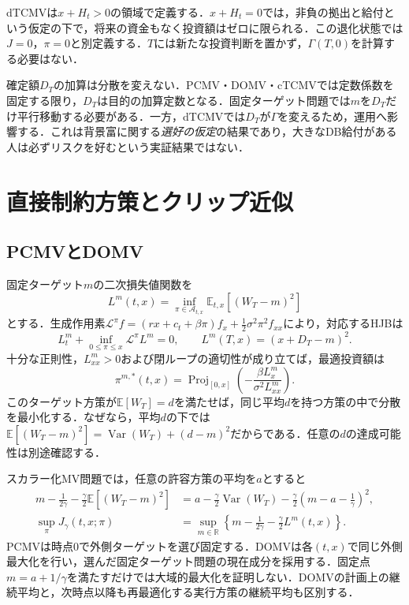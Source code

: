 \documentclass[10pt,a4paper]{article}
\numberwithin{equation}{section}
\numberwithin{table}{section}
\numberwithin{figure}{section}
\theoremstyle{plain}
\theoremstyle{definition}
\newcommand{\E}{\mathbb{E}}
\DeclareMathOperator{\Var}{Var}
\DeclareMathOperator{\Proj}{Proj}
\begin{document}
dTCMVは$x+H_t>0$の領域で定義する．$x+H_t=0$では，非負の拠出と給付という仮定の下で，将来の資金もなく投資額はゼロに限られる．この退化状態では$J=0$，$\pi=0$と別定義する．$T$には新たな投資判断を置かず，$\Gamma(T,0)$を計算する必要はない．

確定額$D_T$の加算は分散を変えない．PCMV・DOMV・cTCMVでは定数係数を固定する限り，$D_T$は目的の加算定数となる．固定ターゲット問題では$m$を$D_T$だけ平行移動する必要がある．一方，dTCMVでは$D_T$が$\Gamma$を変えるため，運用へ影響する．これは背景富に関する\emph{選好の仮定}の結果であり，大きなDB給付がある人は必ずリスクを好むという実証結果ではない．

\section{直接制約方策とクリップ近似}
\label{sec:theory}
\subsection{PCMVとDOMV}
固定ターゲット$m$の二次損失値関数を
\begin{equation}
L^m(t,x)=\inf_{\pi\in\mathcal A_{t,x}}\E_{t,x}[(W_T-m)^2]
\label{eq:loss}
\end{equation}
とする．生成作用素$\mathcal L^\pi f=(rx+c_t+\beta\pi)f_x+\tfrac12\sigma^2\pi^2f_{xx}$により，対応するHJBは
\begin{equation}
L_t^m+\inf_{0\leq\pi\leq x}\mathcal L^\pi L^m=0,
\qquad L^m(T,x)=(x+D_T-m)^2.
\label{eq:hjb}
\end{equation}
十分な正則性，$L_{xx}^m>0$および閉ループの適切性が成り立てば，最適投資額は
\begin{equation}
\pi^{m,*}(t,x)=\Proj_{[0,x]}\left(-\frac{\beta L_x^m}{\sigma^2L_{xx}^m}\right).
\label{eq:pcproj}
\end{equation}
このターゲット方策が$\E[W_T]=d$を満たせば，同じ平均$d$を持つ方策の中で分散を最小化する．なぜなら，平均$d$の下では$\E[(W_T-m)^2]=\Var(W_T)+(d-m)^2$だからである．任意の$d$の達成可能性は別途確認する．

スカラー化MV問題では，任意の許容方策の平均を$a$とすると
\begin{align}
m-\frac1{2\gamma}-\frac\gamma2\E[(W_T-m)^2]
&=a-\frac\gamma2\Var(W_T)-\frac\gamma2\left(m-a-\frac1\gamma\right)^2,\label{eq:envelope-id}\\
\sup_\pi J_\gamma(t,x;\pi)
&=\sup_{m\in\mathbb R}\left\{m-\frac1{2\gamma}-\frac\gamma2L^m(t,x)\right\}.
\label{eq:envelope}
\end{align}
PCMVは時点0で外側ターゲットを選び固定する．DOMVは各$(t,x)$で同じ外側最大化を行い，選んだ固定ターゲット問題の現在成分を採用する．固定点$m=a+1/\gamma$を満たすだけでは大域的最大化を証明しない．DOMVの計画上の継続平均と，次時点以降も再最適化する実行方策の継続平均も区別する．
\end{document}

